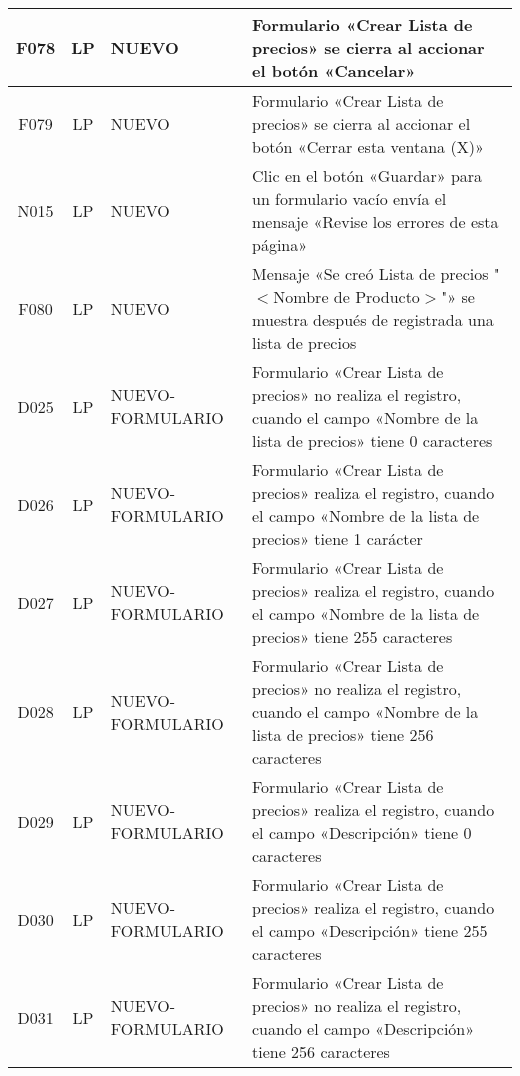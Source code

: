 \begin{landscape}
{\begin{longtable}[htb]{|c|c|p{3.8cm}|p{15.2cm}|}
\scriptsize{F078} & \scriptsize{LP} & \scriptsize{NUEVO} & \scriptsize{Formulario «Crear Lista de precios» se cierra al accionar el botón «Cancelar»} \\ \hline
\scriptsize{F079} & \scriptsize{LP} & \scriptsize{NUEVO} & \scriptsize{Formulario «Crear Lista de precios» se cierra al accionar el botón «Cerrar esta ventana (X)»} \\ \hline
\scriptsize{N015} & \scriptsize{LP} & \scriptsize{NUEVO} & \scriptsize{Clic en el botón «Guardar» para un formulario vacío envía el mensaje «Revise los errores de esta página»} \\ \hline
\scriptsize{F080} & \scriptsize{LP} & \scriptsize{NUEVO} & \scriptsize{Mensaje «Se creó Lista de precios "$<$Nombre de Producto$>$"» se muestra después de registrada una lista de precios} \\ \hline
\scriptsize{D025} & \scriptsize{LP} & \scriptsize{NUEVO-FORMULARIO} & \scriptsize{Formulario «Crear Lista de precios» no realiza el registro, cuando el campo «Nombre de la lista de precios» tiene 0 caracteres} \\ \hline
\scriptsize{D026} & \scriptsize{LP} & \scriptsize{NUEVO-FORMULARIO} & \scriptsize{Formulario «Crear Lista de precios» realiza el registro, cuando el campo «Nombre de la lista de precios» tiene 1 carácter} \\ \hline
\scriptsize{D027} & \scriptsize{LP} & \scriptsize{NUEVO-FORMULARIO} & \scriptsize{Formulario «Crear Lista de precios» realiza el registro, cuando el campo «Nombre de la lista de precios» tiene 255 caracteres} \\ \hline
\scriptsize{D028} & \scriptsize{LP} & \scriptsize{NUEVO-FORMULARIO} & \scriptsize{Formulario «Crear Lista de precios» no realiza el registro, cuando el campo «Nombre de la lista de precios» tiene 256 caracteres} \\ \hline
\scriptsize{D029} & \scriptsize{LP} & \scriptsize{NUEVO-FORMULARIO} & \scriptsize{Formulario «Crear Lista de precios» realiza el registro, cuando el campo «Descripción» tiene 0 caracteres} \\ \hline
\scriptsize{D030} & \scriptsize{LP} & \scriptsize{NUEVO-FORMULARIO} & \scriptsize{Formulario «Crear Lista de precios» realiza el registro, cuando el campo «Descripción» tiene 255 caracteres} \\ \hline
\scriptsize{D031} & \scriptsize{LP} & \scriptsize{NUEVO-FORMULARIO} & \scriptsize{Formulario «Crear Lista de precios» no realiza el registro, cuando el campo «Descripción» tiene 256 caracteres} \\ \hline

\end{longtable}}
\end{landscape}
